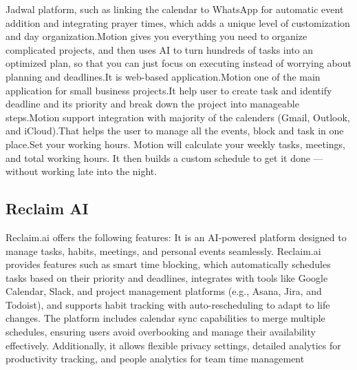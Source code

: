 \documentclass[12pt,a4paper]{report}
\begin{document}
Jadwal platform, such as linking the calendar to WhatsApp for automatic event addition and integrating prayer times, which adds a unique level of customization and day organization.Motion gives you everything you need to organize complicated projects, and then uses AI to turn hundreds of tasks into an optimized plan, so that you can just focus on executing instead of worrying about planning and deadlines\cite{motion}.It is web-based application.Motion one of the main application for small business projects.It help user to create task and identify  deadline and its priority and break down the project into manageable steps.Motion support integration with majority of the calenders (Gmail, Outlook, and iCloud).That helps the user to manage all the events, block and task in one place.Set your working hours. Motion will calculate your weekly tasks, meetings, and total working hours. It then builds a custom schedule to get it done — without working late into the night\cite{motion}.

\subsection{Reclaim AI}

Reclaim.ai offers the following features: It is an AI-powered platform designed to manage tasks, habits, meetings, and personal events seamlessly. Reclaim.ai provides features such as smart time blocking, which automatically schedules tasks based on their priority and deadlines, integrates with tools like Google Calendar, Slack, and project management platforms (e.g., Asana, Jira, and Todoist), and supports habit tracking with auto-rescheduling to adapt to life changes. The platform includes calendar sync capabilities to merge multiple schedules, ensuring users avoid overbooking and manage their availability effectively. Additionally, it allows flexible privacy settings, detailed analytics for productivity tracking, and people analytics for team time management
\end{document}
